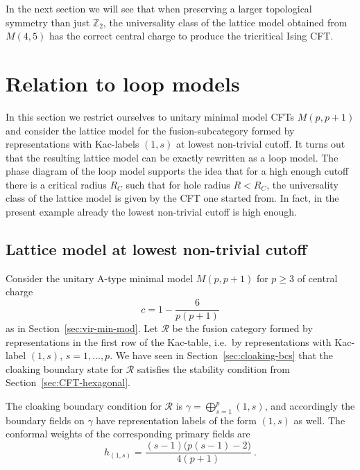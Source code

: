 \documentclass[11pt,a4paper]{article}
\numberwithin{equation}{section}
\begin{document}
\begin{enumerate}
In the next section we will see that when preserving a larger topological symmetry than just $\mathbb{Z}_2$, the universality class of the lattice model obtained from $M(4,5)$ has the correct central charge to produce the tricritical Ising CFT.
\end{enumerate}


\section{Relation to loop models}\label{sec:loop-models}

In this section we restrict ourselves to unitary minimal model CFTs $M(p,p+1)$ and consider the lattice model for the fusion-subcategory formed by representations with Kac-labels $(1,s)$ at lowest non-trivial cutoff. It turns out that the resulting lattice model can be exactly rewritten as a loop model. The phase diagram of the loop model supports the idea that for a high enough cutoff there is a critical radius $R_C$ such that for hole radius $R<R_C$, the universality class of the lattice model is given by the CFT one started from. In fact, in the present example already the lowest non-trivial cutoff is high enough.

\subsection{Lattice model at lowest non-trivial cutoff}

Consider the unitary A-type minimal model $M(p,p+1)$ for $p \ge 3$ of central charge 
\begin{equation}\label{eq:unitary-minmod-c}
    c = 1 - \frac{6}{p(p+1)} 
\end{equation}
as in Section~\ref{sec:vir-min-mod}.
Let $\mathcal{R}$ be the fusion category formed by representations in the first row of the Kac-table, i.e.\ by representations with Kac-label $(1,s)$, $s=1,\dots,p$. We have seen in Section~\ref{sec:cloaking-bcs} that the cloaking boundary state for $\mathcal{R}$ satisfies the stability condition from Section~\ref{sec:CFT-hexagonal}.

The cloaking boundary condition for $\mathcal{R}$ is $\gamma = \bigoplus_{s=1}^{p} (1,s)$, and accordingly the boundary fields on $\gamma$ have representation labels of the form $(1,s)$ as well. The conformal weights of the corresponding primary fields are
\begin{equation}
    h_{(1,s)} = \frac{(s-1)\big(p(s-1)-2\big)}{4(p+1)} \ .
\end{equation}
\end{document}
